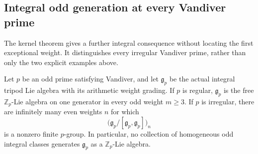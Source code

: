 \subsection{Integral odd generation at every Vandiver prime}
\label{sec:integral-classification}

The kernel theorem gives a further integral consequence without locating
the first exceptional weight.  It distinguishes every irregular Vandiver
prime, rather than only the two explicit examples above.

\begin{theorem}
\label{thm:integral-classification}
Let $p$ be an odd prime satisfying Vandiver, and let
$\mathfrak g_p$ be the actual integral tripod Lie algebra with its
arithmetic weight grading.
If $p$ is regular, $\mathfrak g_p$ is the free $\mathbb Z_p$-Lie
algebra on one generator in every odd weight $m\ge3$.
If $p$ is irregular, there are infinitely many even weights $n$ for which
\[
 \bigl(\mathfrak g_p/[\mathfrak g_p,\mathfrak g_p]\bigr)_n
\]
is a nonzero finite $p$-group.  In particular, no collection of
homogeneous odd integral classes generates $\mathfrak g_p$ as a
$\mathbb Z_p$-Lie algebra.
\end{theorem}

